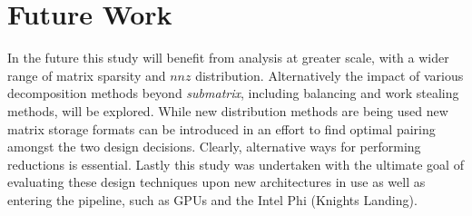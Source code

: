 \section{Future Work}\label{sec:dspmv-futurework}

In the future this study will benefit from analysis at greater scale, with a wider range of matrix sparsity and $nnz$ distribution. Alternatively the impact of various decomposition methods beyond \emph{submatrix}, including balancing and work stealing methods, will be explored. While new distribution methods are being used new matrix storage formats can be introduced in an effort to find optimal pairing amongst the two design decisions. Clearly, alternative ways for performing reductions is essential. Lastly this study was undertaken with the ultimate goal of evaluating these design techniques upon new architectures in use as well as entering the pipeline, such as GPUs and the Intel Phi (Knights Landing).
